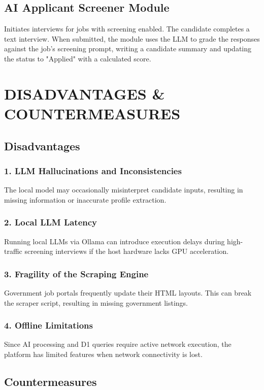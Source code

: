 \documentclass[12pt,a4paper]{report}
\begin{document}
\section{AI Applicant Screener Module}
Initiates interviews for jobs with screening enabled. The candidate completes a text interview. When submitted, the module uses the LLM to grade the responses against the job's screening prompt, writing a candidate summary and updating the status to "Applied" with a calculated score.


\chapter{DISADVANTAGES \& COUNTERMEASURES}

\section{Disadvantages}

\subsection{1. LLM Hallucinations and Inconsistencies}
The local model may occasionally misinterpret candidate inputs, resulting in missing information or inaccurate profile extraction.

\subsection{2. Local LLM Latency}
Running local LLMs via Ollama can introduce execution delays during high-traffic screening interviews if the host hardware lacks GPU acceleration.

\subsection{3. Fragility of the Scraping Engine}
Government job portals frequently update their HTML layouts. This can break the scraper script, resulting in missing government listings.

\subsection{4. Offline Limitations}
Since AI processing and D1 queries require active network execution, the platform has limited features when network connectivity is lost.

\section{Countermeasures}
\end{document}
